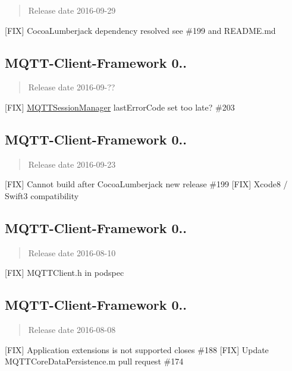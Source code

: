 \begin{quote}
Release date 2016-\/09-\/29 \end{quote}


\mbox{[}F\+IX\mbox{]} Cocoa\+Lumberjack dependency resolved see \#199 and R\+E\+A\+D\+M\+E.\+md

\subsection*{M\+Q\+T\+T-\/\+Client-\/\+Framework 0..}

\begin{quote}
Release date 2016-\/09-\/?? \end{quote}


\mbox{[}F\+IX\mbox{]} \hyperlink{interface_m_q_t_t_session_manager}{M\+Q\+T\+T\+Session\+Manager} last\+Error\+Code set too late? \#203

\subsection*{M\+Q\+T\+T-\/\+Client-\/\+Framework 0..}

\begin{quote}
Release date 2016-\/09-\/23 \end{quote}


\mbox{[}F\+IX\mbox{]} Cannot build after Cocoa\+Lumberjack new release \#199 \mbox{[}F\+IX\mbox{]} Xcode8 / Swift3 compatibility

\subsection*{M\+Q\+T\+T-\/\+Client-\/\+Framework 0..}

\begin{quote}
Release date 2016-\/08-\/10 \end{quote}


\mbox{[}F\+IX\mbox{]} M\+Q\+T\+T\+Client.\+h in podspec

\subsection*{M\+Q\+T\+T-\/\+Client-\/\+Framework 0..}

\begin{quote}
Release date 2016-\/08-\/08 \end{quote}


\mbox{[}F\+IX\mbox{]} Application extensions is not supported closes \#188 \mbox{[}F\+IX\mbox{]} Update M\+Q\+T\+T\+Core\+Data\+Persistence.\+m pull request \#174

